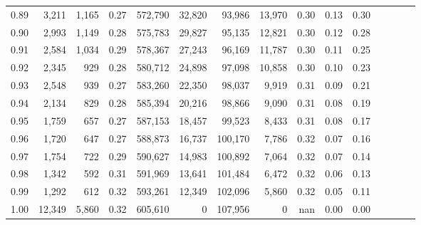 \begin{tabular}{rrrcrrrrrrrrrrr}
0.89 &   3,211 &  1,165 &                                       0.27 &  572,790 &   32,820 &   93,986 &   13,970 &  0.30 &  0.13 &                         0.30 \\
0.90 &   2,993 &  1,149 &                                       0.28 &  575,783 &   29,827 &   95,135 &   12,821 &  0.30 &  0.12 &                         0.28 \\
0.91 &   2,584 &  1,034 &                                       0.29 &  578,367 &   27,243 &   96,169 &   11,787 &  0.30 &  0.11 &                         0.25 \\
0.92 &   2,345 &    929 &                                       0.28 &  580,712 &   24,898 &   97,098 &   10,858 &  0.30 &  0.10 &                         0.23 \\
0.93 &   2,548 &    939 &                                       0.27 &  583,260 &   22,350 &   98,037 &    9,919 &  0.31 &  0.09 &                         0.21 \\
0.94 &   2,134 &    829 &                                       0.28 &  585,394 &   20,216 &   98,866 &    9,090 &  0.31 &  0.08 &                         0.19 \\
0.95 &   1,759 &    657 &                                       0.27 &  587,153 &   18,457 &   99,523 &    8,433 &  0.31 &  0.08 &                         0.17 \\
0.96 &   1,720 &    647 &                                       0.27 &  588,873 &   16,737 &  100,170 &    7,786 &  0.32 &  0.07 &                         0.16 \\
0.97 &   1,754 &    722 &                                       0.29 &  590,627 &   14,983 &  100,892 &    7,064 &  0.32 &  0.07 &                         0.14 \\
0.98 &   1,342 &    592 &                                       0.31 &  591,969 &   13,641 &  101,484 &    6,472 &  0.32 &  0.06 &                         0.13 \\
0.99 &   1,292 &    612 &                                       0.32 &  593,261 &   12,349 &  102,096 &    5,860 &  0.32 &  0.05 &                         0.11 \\
1.00 &  12,349 &  5,860 &                                       0.32 &  605,610 &        0 &  107,956 &        0 &   nan &  0.00 &                         0.00 \\
\bottomrule
\end{tabular}
